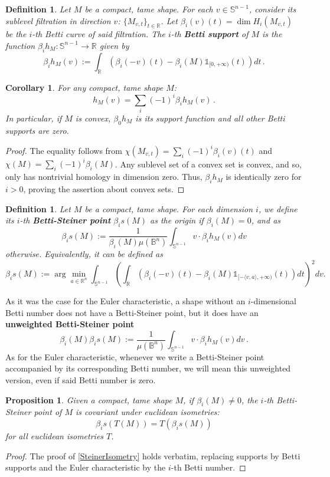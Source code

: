 \documentclass[a4paper]{article}
\newtheorem{prop}[theorem]{Proposition}
\newtheorem{coro}[theorem]{Corollary}
\newtheorem{definition}[theorem]{Definition}
\newcommand{\bb}{\mathbb}
\begin{document}
\begin{definition}
	Let $M$ be a compact, tame shape. For each $v\in \bb S^{n-1}$, consider its sublevel filtration in direction $v$: $\{ M_{v,t} \}_{t \in \bb R}$. Let $\beta_i(v)(t)=\dim H_i(M_{v,t})$ be the $i$-th Betti curve of said filtration. The $i$-th \textbf{Betti support} of $M$ is the function $\beta_ih_M:\bb S^{n-1} \to \bb R$ given by
	\[\beta_ih_M(v):= \int_{\bb R} (\beta_i(-v)(t)-\beta_i(M)\bb 1_{[0, +\infty)}(t)) dt \, . \]
\end{definition}

\begin{coro}
	\label{SuppCombBetti}
	For any compact, tame shape $M$:
	\[ h_M(v)=\sum_{i}(-1)^i \beta_ih_M(v)\, . \]
	In particular, if $M$ is convex, $\beta_0h_M$ is its support function and all other Betti supports are zero.
\end{coro}

\begin{proof}
	The equality follows from $\chi(M_{v,t})=\sum_i (-1)^i \beta_i(v)(t)$ and $\chi(M)=\sum_i (-1)^i \beta_i(M)$. Any sublevel set of a convex set is convex, and so, only has nontrivial homology in dimension zero. Thus, $\beta_ih_M$ is identically zero for $i>0$, proving the assertion about convex sets.
\end{proof}

\begin{definition}
	Let $M$ be a compact, tame shape. For each dimension $i$, we define its $i$-th \textbf{Betti-Steiner point} $\beta_is(M)$ as the origin if $\beta_i(M)=0$, and as
	\[\beta_is(M):=\frac{1}{\beta_i(M)\mu(\bb B^n)} \int_{\bb S^{n-1}} v \cdot \beta_ih_M(v) dv\]
	otherwise. Equivalently, it can be defined as
	\[ \beta_is(M):= \arg\min_{a \in \bb R^n}\int_{\bb S^{n-1}} \left(\int_{\bb R} (\beta_i(-v)(t) -\beta_i(M)\bb 1_{[-\langle v,a \rangle, +\infty)}(t)) dt \right)^2 dv. \]
\end{definition}

As it was the case for the Euler characteristic, a shape without an $i$-dimensional Betti number does not have a Betti-Steiner point, but it does have an \textbf{unweighted Betti-Steiner point}
\[ \beta_i(M)\beta_is(M):=\frac{1}{\mu(\bb B^n)} \int_{\bb S^{n-1}} v \cdot \beta_ih_M(v) dv\, .\]
As for the Euler characteristic, whenever we write a Betti-Steiner point accompanied by its corresponding Betti number, we will mean this unweighted version, even if said Betti number is zero.
\begin{prop}
	Given a compact, tame shape $M$, if $\beta_i(M) \neq 0$, the $i$-th Betti-Steiner point of $M$ is covariant under euclidean isometries:
	\[ \beta_is(T(M))=T(\beta_is(M)) \]
	for all euclidean isometries $T$.
\end{prop}
\begin{proof}
	The proof of \ref{SteinerIsometry} holds verbatim, replacing supports by Betti supports and the Euler characteristic by the $i$-th Betti number.
\end{proof}
\end{document}
